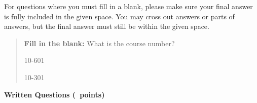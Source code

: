 \documentclass[11pt,addpoints,answers]{exam}
\begin{document}
For questions where you must fill in a blank, please make sure your final answer is fully included in the given space. You may cross out answers or parts of answers, but the final answer must still be within the given space.

\begin{quote}
\textbf{Fill in the blank:} What is the course number?

\begin{tcolorbox}[fit,height=1cm, width=4cm, blank, borderline={1pt}{-2pt},nobeforeafter]
    \begin{center}\huge10-601\end{center}
    \end{tcolorbox}\hspace{2cm}
    \begin{tcolorbox}[fit,height=1cm, width=4cm, blank, borderline={1pt}{-2pt},nobeforeafter]
    \begin{center}\huge10-301\end{center}
    \end{tcolorbox}
\end{quote}
\clearpage
{\LARGE \bf Written Questions (\numpoints \ points)} 
\end{document}

